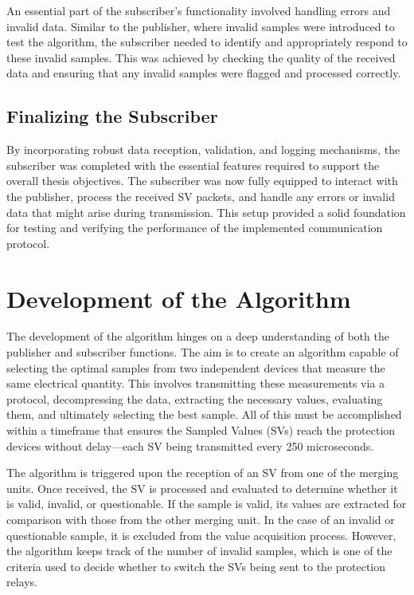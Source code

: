 An essential part of the subscriber’s functionality involved handling errors and invalid data. Similar to the publisher, where invalid samples were introduced to test the algorithm, the subscriber needed to identify and appropriately respond to these invalid samples. This was achieved by checking the quality of the received data and ensuring that any invalid samples were flagged and processed correctly.

\subsection{Finalizing the Subscriber}

By incorporating robust data reception, validation, and logging mechanisms, the subscriber was completed with the essential features required to support the overall thesis objectives. The subscriber was now fully equipped to interact with the publisher, process the received SV packets, and handle any errors or invalid data that might arise during transmission. This setup provided a solid foundation for testing and verifying the performance of the implemented communication protocol.

\section{Development of the Algorithm}

The development of the algorithm hinges on a deep understanding of both the publisher and subscriber functions. The aim is to create an algorithm capable of selecting the optimal samples from two independent devices that measure the same electrical quantity. This involves transmitting these measurements via a protocol, decompressing the data, extracting the necessary values, evaluating them, and ultimately selecting the best sample. All of this must be accomplished within a timeframe that ensures the Sampled Values (SVs) reach the protection devices without delay—each SV being transmitted every 250 microseconds.

The algorithm is triggered upon the reception of an SV from one of the merging units. Once received, the SV is processed and evaluated to determine whether it is valid, invalid, or questionable. If the sample is valid, its values are extracted for comparison with those from the other merging unit. In the case of an invalid or questionable sample, it is excluded from the value acquisition process. However, the algorithm keeps track of the number of invalid samples, which is one of the criteria used to decide whether to switch the SVs being sent to the protection relays.

